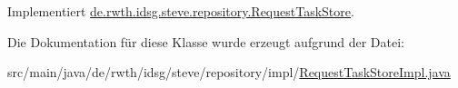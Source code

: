 Implementiert \hyperlink{interfacede_1_1rwth_1_1idsg_1_1steve_1_1repository_1_1_request_task_store_af22a1410a8649879431472bec063b856}{de.\-rwth.\-idsg.\-steve.\-repository.\-Request\-Task\-Store}.



Die Dokumentation für diese Klasse wurde erzeugt aufgrund der Datei\-:\begin{DoxyCompactItemize}
\item 
src/main/java/de/rwth/idsg/steve/repository/impl/\hyperlink{_request_task_store_impl_8java}{Request\-Task\-Store\-Impl.\-java}\end{DoxyCompactItemize}

